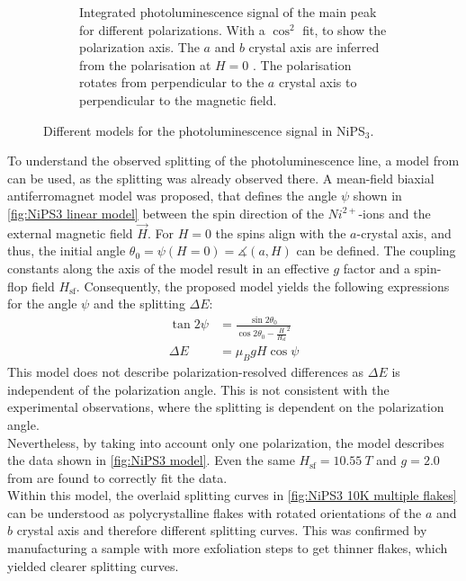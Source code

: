\documentclass[
	twoside,
	parskip=half,
	a4paper,
]{scrbook}
\begin{document}
\begin{figure}
\begin{subfigure}[t]{3in}
		\caption{
			Integrated photoluminescence signal of the main peak for different polarizations. 
			With a $\cos^2$ fit, to show the polarization axis. 
			The $a$ and $b$ crystal axis are inferred from the polarisation at $H=0$ \cite{NiPS3_linear}.
			The polarisation rotates from perpendicular to the $a$ crystal axis to perpendicular to the magnetic field. 
		}
		\label{fig:NiPS3 polarisation peanut}
	\end{subfigure}
	\caption{Different models for the photoluminescence signal in NiPS$_3$.}
\end{figure}
To understand the observed splitting of the photoluminescence line, a model from \cite{NiPS3_magnon_gap} can be used, as the splitting was already observed there. 
A mean-field biaxial antiferromagnet model was proposed, that defines the angle $\psi$ shown in \autoref{fig:NiPS3 linear model} between the spin direction of the $Ni^{2+}$-ions and the external magnetic field $\vec{H}$.
For $H=0$ the spins align with the $a$-crystal axis, and thus, the initial angle $\theta_0=\psi\left(H=0\right)=\measuredangle(a, H)$ can be defined.
The coupling constants along the axis of the model result in an effective $g$ factor and a spin-flop field $H_\text{sf}$.
Consequently, the proposed model \autocite{NiPS3_magnon_gap} yields the following expressions for the angle $\psi$ and the splitting $\Delta E$:
\begin{align}
	\tan 2\psi &= \frac{\sin 2\theta_0}{\cos 2\theta_0 - \frac{H}{H_\text{sf}}^2}\\
	\Delta E &= \mu_B g H \cos \psi
	\label{eq:NiPS3 model}
\end{align}
This model does not describe polarization-resolved differences as $\Delta E$ is independent of the polarization angle.
This is not consistent with the experimental observations, where the splitting is dependent on the polarization angle.\\
Nevertheless, by taking into account only one polarization, the model describes the data shown in \autoref{fig:NiPS3 model}.
Even the same $H_\text{sf} = \SI{10.55}{T}$ and $g=\SI{2.0}{}$ from \autocite{NiPS3_magnon_gap} are found to correctly fit the data.\\
Within this model, the overlaid splitting curves in \autoref{fig:NiPS3 10K multiple flakes} can be understood as polycrystalline flakes with rotated orientations of the $a$ and $b$ crystal axis and therefore different splitting curves.
This was confirmed by manufacturing a sample with more exfoliation steps to get thinner flakes, which yielded clearer splitting curves.
\end{document}
